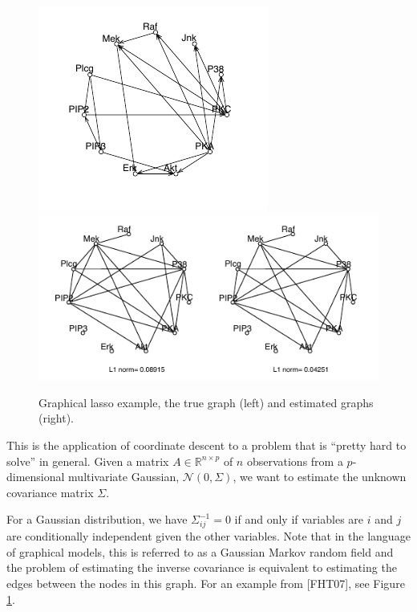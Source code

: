 \documentclass[twoside]{article}
\renewcommand{\cite}[1]{[#1]}
\begin{document}
\begin{figure}
\begin{center}
\hspace{.5in}
\includegraphics{images/glasso1}
\hfill
\includegraphics{images/glasso2}
\end{center}
\caption{Graphical lasso example, the true graph (left) and estimated graphs (right).}
\label{glasso}
\end{figure}

This is the application of coordinate descent to a problem that is ``pretty hard to solve'' in general. Given a matrix $A \in \mathbb{R}^{n \times p}$ of $n$ observations from a $p$-dimensional multivariate Gaussian, $\mathcal{N}(0,\Sigma)$, we want to estimate the unknown covariance matrix $\Sigma$. 

For a Gaussian distribution, we have $\Sigma_{ij}^{-1} = 0$ if and only if variables are $i$ and $j$ are conditionally independent given the other variables. Note that in the language of graphical models, this is referred to as a Gaussian Markov random field and the problem of estimating the inverse covariance is equivalent to estimating the edges between the nodes in this graph. For an example from \cite{FHT07}, see Figure \ref{glasso}.
\end{document}

